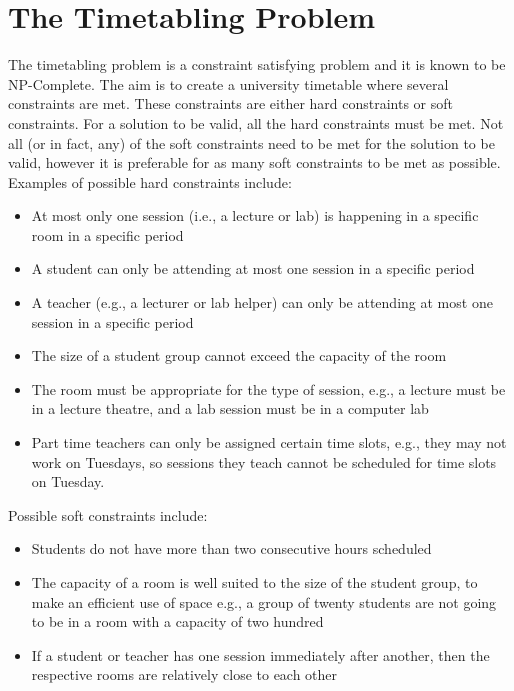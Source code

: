 \documentclass[a4paper, 12pt]{report}
\begin{document}
\section{The Timetabling Problem}

The timetabling problem is a constraint satisfying problem and it is known to
be NP-Complete.
The aim is to create a university timetable where several constraints are met.
These constraints are either hard constraints or soft constraints.
For a solution to be valid, all the hard constraints must be met.
Not all (or in fact, any) of the soft constraints need to be met for the
solution to be valid, however it is preferable for as many soft constraints to
be met as possible.
Examples of possible hard constraints include:

\begin{itemize}
	\item At most only one session (i.e., a lecture or lab) is happening in a 
		specific room in a specific period
	\item A student can only be attending at most one session in a specific 
		period
	\item A teacher (e.g., a lecturer or lab helper) can only be attending at 
		most one session in a specific period
	\item The size of a student group cannot exceed the capacity of the room
	\item The room must be appropriate for the type of session, e.g., a lecture 
		must be in a lecture theatre, and a lab session must be in a computer 
		lab
	\item Part time teachers can only be assigned certain time slots, e.g., they
		may not work on Tuesdays, so sessions they teach cannot be scheduled
		for time slots on Tuesday.
\end{itemize}

Possible soft constraints include:

\begin{itemize}
	\item Students do not have more than two consecutive hours scheduled
	\item The capacity of a room is well suited to the size of the student
		group, to make an efficient use of space e.g., a group of twenty
		students are not going to be in a room with a capacity of two hundred
	\item If a student or teacher has one session immediately after another,
		then the respective rooms are relatively close to each other
\end{itemize}
\end{document}
